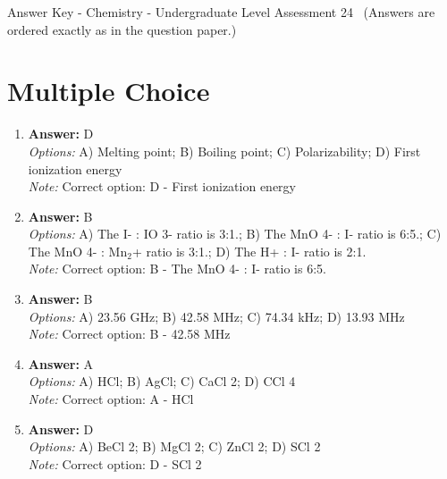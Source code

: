 \documentclass[12pt]{article}
\begin{document}
\begin{center}
Answer Key - Chemistry - Undergraduate Level Assessment 24 \
\small (Answers are ordered exactly as in the question paper.)
\end{center}

\section*{Multiple Choice}
\begin{enumerate}[label=\arabic*.]
\item \textbf{Answer:} D
\\ \textit{Options:} A) Melting point; B) Boiling point; C) Polarizability; D) First ionization energy
\\ \textit{Note:} Correct option: D - First ionization energy
\item \textbf{Answer:} B
\\ \textit{Options:} A) The I- : IO 3- ratio is 3:1.; B) The MnO 4- : I- ratio is 6:5.; C) The MnO 4- : Mn$_{2}$+ ratio is 3:1.; D) The H+ : I- ratio is 2:1.
\\ \textit{Note:} Correct option: B - The MnO 4- : I- ratio is 6:5.
\item \textbf{Answer:} B
\\ \textit{Options:} A) 23.56 GHz; B) 42.58 MHz; C) 74.34 kHz; D) 13.93 MHz
\\ \textit{Note:} Correct option: B - 42.58 MHz
\item \textbf{Answer:} A
\\ \textit{Options:} A) HCl; B) AgCl; C) CaCl 2; D) CCl 4
\\ \textit{Note:} Correct option: A - HCl
\item \textbf{Answer:} D
\\ \textit{Options:} A) BeCl 2; B) MgCl 2; C) ZnCl 2; D) SCl 2
\\ \textit{Note:} Correct option: D - SCl 2
\end{enumerate}
\end{document}
